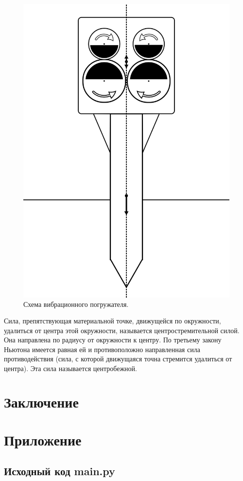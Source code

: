 \begin{figure}[h]
    \centering
    \includegraphics[width=0.5\linewidth]{img/scheme_porg.png}
    \caption{Схема вибрационного погружателя.}
    \label{fig:scheme_porg}
\end{figure}

\begin{definition}
    Сила, препятствующая материальной точке, движущейся по окружности, удалиться от центра этой окружности, называется центростремительной силой. Она направлена по радиусу от окружности к центру. По третьему закону Ньютона имеется равная ей и противоположно направленная сила противодействия (сила, с которой движущаяся точна стремится удалиться от центра). Эта сила называется центробежной.
\end{definition}

\clearpage
\section{Заключение}


\clearpage
\section{Приложение}
\subsection{Исходный код main.py}
% 


\clearpage
{}
\begin{thebibliography}{}
    \bibitem{}
\end{thebibliography}

